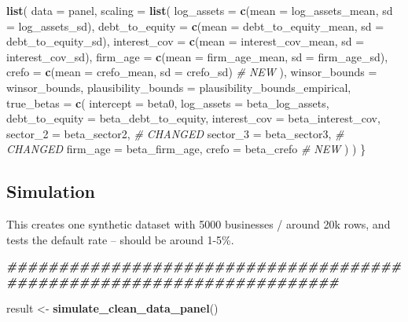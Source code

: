 \documentclass[
]{article}
\newenvironment{Shaded}{\begin{snugshade}}{\end{snugshade}}
\newcommand{\AttributeTok}[1]{\textcolor[rgb]{0.13,0.29,0.53}{#1}}
\newcommand{\CommentTok}[1]{\textcolor[rgb]{0.56,0.35,0.01}{\textit{#1}}}
\newcommand{\DocumentationTok}[1]{\textcolor[rgb]{0.56,0.35,0.01}{\textbf{\textit{#1}}}}
\newcommand{\FunctionTok}[1]{\textcolor[rgb]{0.13,0.29,0.53}{\textbf{#1}}}
\newcommand{\NormalTok}[1]{#1}
\newcommand{\OtherTok}[1]{\textcolor[rgb]{0.56,0.35,0.01}{#1}}
\begin{document}
\begin{Shaded}
\begin{Highlighting}[]
  \FunctionTok{list}\NormalTok{(}
    \AttributeTok{data =}\NormalTok{ panel,}
    \AttributeTok{scaling =} \FunctionTok{list}\NormalTok{(}
      \AttributeTok{log\_assets     =} \FunctionTok{c}\NormalTok{(}\AttributeTok{mean =}\NormalTok{ log\_assets\_mean,     }\AttributeTok{sd =}\NormalTok{ log\_assets\_sd),}
      \AttributeTok{debt\_to\_equity =} \FunctionTok{c}\NormalTok{(}\AttributeTok{mean =}\NormalTok{ debt\_to\_equity\_mean, }\AttributeTok{sd =}\NormalTok{ debt\_to\_equity\_sd),}
      \AttributeTok{interest\_cov   =} \FunctionTok{c}\NormalTok{(}\AttributeTok{mean =}\NormalTok{ interest\_cov\_mean,   }\AttributeTok{sd =}\NormalTok{ interest\_cov\_sd),}
      \AttributeTok{firm\_age       =} \FunctionTok{c}\NormalTok{(}\AttributeTok{mean =}\NormalTok{ firm\_age\_mean,        }\AttributeTok{sd =}\NormalTok{ firm\_age\_sd),}
      \AttributeTok{crefo          =} \FunctionTok{c}\NormalTok{(}\AttributeTok{mean =}\NormalTok{ crefo\_mean,           }\AttributeTok{sd =}\NormalTok{ crefo\_sd)    }\CommentTok{\# NEW}
\NormalTok{    ),}
    \AttributeTok{winsor\_bounds =}\NormalTok{ winsor\_bounds,}
    \AttributeTok{plausibility\_bounds =}\NormalTok{ plausibility\_bounds\_empirical,  }
    \AttributeTok{true\_betas =} \FunctionTok{c}\NormalTok{(}
      \AttributeTok{intercept       =}\NormalTok{ beta0,}
      \AttributeTok{log\_assets      =}\NormalTok{ beta\_log\_assets,}
      \AttributeTok{debt\_to\_equity  =}\NormalTok{ beta\_debt\_to\_equity,}
      \AttributeTok{interest\_cov    =}\NormalTok{ beta\_interest\_cov,}
      \AttributeTok{sector\_2        =}\NormalTok{ beta\_sector2,        }\CommentTok{\# CHANGED}
      \AttributeTok{sector\_3        =}\NormalTok{ beta\_sector3,        }\CommentTok{\# CHANGED}
      \AttributeTok{firm\_age        =}\NormalTok{ beta\_firm\_age,}
      \AttributeTok{crefo           =}\NormalTok{ beta\_crefo           }\CommentTok{\# NEW}
\NormalTok{    )}
\NormalTok{  )}
\NormalTok{\}}
\end{Highlighting}
\end{Shaded}

\subsection{Simulation}\label{simulation}

This creates one synthetic dataset with 5000 businesses / around 20k
rows, and tests the default rate -- should be around 1-5\%.

\begin{Shaded}
\begin{Highlighting}[]
\DocumentationTok{\#\#\#\#\#\#\#\#\#\#\#\#\#\#\#\#\#\#\#\#\#\#\#\#\#\#\#\#\#\#\#\#\#\#\#\#\#\#\#\#\#\#\#\#\#\#\#\#\#\#\#\#\#\#\#\#\#\#\#\#\#\#\#\#\#\#\#\#\#\#}

\NormalTok{result }\OtherTok{\textless{}{-}} \FunctionTok{simulate\_clean\_data\_panel}\NormalTok{()}
\end{Highlighting}
\end{Shaded}
\end{document}
